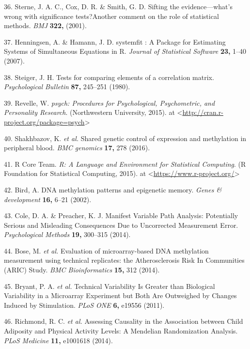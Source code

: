 \documentclass[]{article}
\begin{document}
\hypertarget{ref-Sterne2001}{}
36. Sterne, J. A. C., Cox, D. R. \& Smith, G. D. Sifting the
evidence---what's wrong with significance tests?Another comment on the
role of statistical methods. \emph{BMJ} \textbf{322,} (2001).

\hypertarget{ref-Henningsen2007}{}
37. Henningsen, A. \& Hamann, J. D. systemfit : A Package for Estimating
Systems of Simultaneous Equations in R. \emph{Journal of Statistical
Software} \textbf{23,} 1--40 (2007).

\hypertarget{ref-Steiger1980}{}
38. Steiger, J. H. Tests for comparing elements of a correlation matrix.
\emph{Psychological Bulletin} \textbf{87,} 245--251 (1980).

\hypertarget{ref-Revelle2015}{}
39. Revelle, W. \emph{psych: Procedures for Psychological, Psychometric,
and Personality Research}. (Northwestern University, 2015). at
\textless{}\url{http://cran.r-project.org/package=psych}\textgreater{}

\hypertarget{ref-Shakhbazov2016}{}
40. Shakhbazov, K. \emph{et al.} Shared genetic control of expression
and methylation in peripheral blood. \emph{BMC genomics} \textbf{17,}
278 (2016).

\hypertarget{ref-RCoreTeam2015}{}
41. R Core Team. \emph{R: A Language and Environment for Statistical
Computing}. (R Foundation for Statistical Computing, 2015). at
\textless{}\url{https://www.r-project.org/}\textgreater{}

\hypertarget{ref-Bird2002}{}
42. Bird, A. DNA methylation patterns and epigenetic memory. \emph{Genes
\& development} \textbf{16,} 6--21 (2002).

\hypertarget{ref-Cole2014}{}
43. Cole, D. A. \& Preacher, K. J. Manifest Variable Path Analysis:
Potentially Serious and Misleading Consequences Due to Uncorrected
Measurement Error. \emph{Psychological Methods} \textbf{19,} 300--315
(2014).

\hypertarget{ref-Bose2014}{}
44. Bose, M. \emph{et al.} Evaluation of microarray-based DNA
methylation measurement using technical replicates: the Atherosclerosis
Risk In Communities (ARIC) Study. \emph{BMC Bioinformatics} \textbf{15,}
312 (2014).

\hypertarget{ref-Bryant2011}{}
45. Bryant, P. A. \emph{et al.} Technical Variability Is Greater than
Biological Variability in a Microarray Experiment but Both Are
Outweighed by Changes Induced by Stimulation. \emph{PLoS ONE}
\textbf{6,} e19556 (2011).

\hypertarget{ref-Richmond2014}{}
46. Richmond, R. C. \emph{et al.} Assessing Causality in the Association
between Child Adiposity and Physical Activity Levels: A Mendelian
Randomization Analysis. \emph{PLoS Medicine} \textbf{11,} e1001618
(2014).
\end{document}
